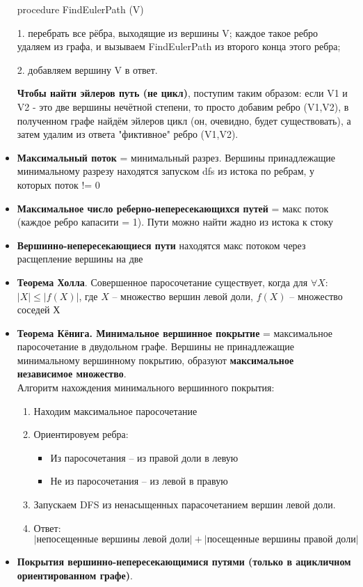 \documentclass[10pt]{article}
\begin{document}
\begin{itemize}
procedure FindEulerPath (V)


	1. перебрать все рёбра, выходящие из вершины V;
		каждое такое ребро удаляем из графа, и
		вызываем FindEulerPath из второго конца этого ребра;


  2. добавляем вершину V в ответ.

\textbf{Чтобы найти эйлеров путь (не цикл)}, поступим таким образом: если V1 и V2 - это две вершины нечётной степени, то просто добавим ребро (V1,V2), в полученном графе найдём эйлеров цикл (он, очевидно, будет существовать), а затем удалим из ответа "фиктивное" ребро (V1,V2).
\item \textbf{Максимальный поток} = минимальный разрез. Вершины принадлежащие минимальному разрезу находятся запуском dfs из истока по ребрам, у которых поток != 0
\item \textbf{Максимальное число реберно-непересекающихся путей} = макс поток (каждое ребро капасити = 1). Пути можно найти жадно из истока к стоку
\item \textbf{Вершинно-непересекающиеся пути} находятся макс потоком через расщепление вершины на две
\item \textbf{Теорема Холла}. Совершенное паросочетание существует, когда для $\forall X$:
$\left|X\right| \le \left|f(X) \right|$, где $X$ -- множество вершин левой доли, $f(X)$ -- множество соседей Х
\item \textbf{Теорема Кёнига. Минимальное вершинное покрытие} = максимальное паросочетание в двудольном графе. 
Вершины не принадлежащие минимальному вершинному покрытию, образуют 
\textbf{максимальное независимое множество}.\\
Алгоритм нахождения минимального вершинного покрытия:
\begin{enumerate}
  \item Находим максимальное паросочетание
  \item Ориентировуем ребра:
  \begin{itemize}
    \item Из паросочетания -- из правой доли в левую
    \item Не из паросочетания -- из левой в правую
  \end{itemize}
  \item Запускаем DFS из ненасыщенных парасочетанием вершин левой доли.
  \item Ответ: $\left|\text{непосещенные вершины левой доли}\right| + \left|\text{посещенные вершины правой доли}\right|$
\end{enumerate}
\item \textbf{Покрытия вершинно-непересекающимися путями (только в ацикличном ориентированном графе)}.

\end{itemize}
\end{document}
